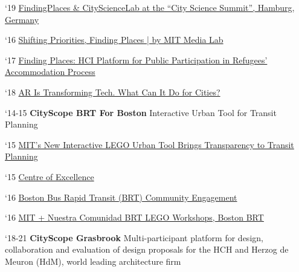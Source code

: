 \begin{tablist}
   \begin{tablist}

      \item[`19] \tab \href{https://www.youtube.com/watch?v=PZg6A_A65lQ}{FindingPlaces \& CityScienceLab at the “City Science Summit”, Hamburg, Germany}

      \item[`16] \tab  \href{https://medium.com/mit-media-lab/shifting-priorities-finding-places-9ad3bdbe38b8}{Shifting Priorities, Finding Places | by MIT Media Lab}

      \item[`17] \tab \href{https://www.media.mit.edu/publications/finding-places/}{Finding Places: HCI Platform for Public Participation in Refugees’ Accommodation Process}

      \item[`18] \tab  \href{https://datasmart.ash.harvard.edu/news/article/ar-transforming-tech-what-can-it-do-cities}{AR Is Transforming Tech. What Can It Do for Cities?}

   \end{tablist}


   \item[`14-15] \tab \textbf{CityScope BRT For Boston} {Interactive Urban Tool for Transit Planning}

   \begin{tablist}

      \item[`15] \tab  \href{https://www.bloomberg.com/news/articles/2015-10-16/mit-s-new-interactive-lego-urban-tool-brings-transparency-to-transit-planning}
      {MIT's New Interactive LEGO Urban Tool Brings Transparency to Transit Planning}

      \item[`15] \tab  \href{http://www.brt.cl/new-tools-for-a-new-era-of-open-transportation-planning/}
      {Centre of Excellence}

      \item[`16] \tab  \href{https://www.media.mit.edu/projects/CityscopeBostonBRT/overview/}
      {Boston Bus Rapid Transit (BRT) Community Engagement}

      \item[`16] \tab  \href{http://www.bostonbrt.org/mit-nuestra-comunidad-brt-lego-workshops}
      {MIT + Nuestra Comunidad BRT LEGO Workshops, Boston BRT}

   \end{tablist}

   \item[`18-21] \tab \textbf{CityScope Grasbrook} {Multi-participant platform for design, collaboration and evaluation of design proposals for the HCH and Herzog de Meuron (HdM), world leading architecture firm}



\end{tablist}

